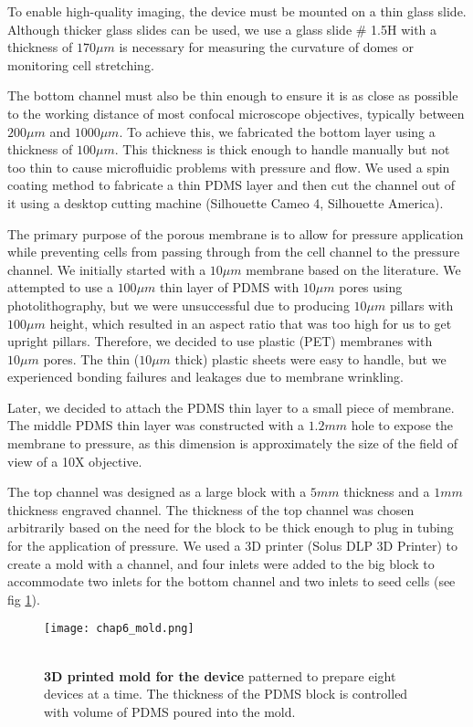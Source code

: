 To enable high-quality imaging, the device must be mounted on a thin glass slide. Although thicker glass slides can be used, we use a glass slide \# 1.5H with a thickness of $170 \mu m$ is necessary for measuring the curvature of domes or monitoring cell stretching.  

The bottom channel must also be thin enough to ensure it is as close as possible to the working distance of most confocal microscope objectives, typically between $200\mu m$ and $1000 \mu m$. To achieve this, we fabricated the bottom layer using a thickness of $100 \mu m$. This thickness is thick enough to handle manually but not too thin to cause microfluidic problems with pressure and flow. We used a spin coating method to fabricate a thin PDMS layer and then cut the channel out of it using a desktop cutting machine (Silhouette Cameo 4, Silhouette America).  

The primary purpose of the porous membrane is to allow for pressure application while preventing cells from passing through from the cell channel to the pressure channel. We initially started with a $10\mu m$ membrane based on the literature. We attempted to use a $100 \mu m$ thin layer of PDMS with $10\mu m$ pores using photolithography, but we were unsuccessful due to producing $10\mu m$ pillars with $100 \mu m$ height, which resulted in an aspect ratio that was too high for us to get upright pillars. Therefore, we decided to use plastic (PET) membranes with $10\mu m$ pores. The thin ($10\mu m$ thick) plastic sheets were easy to handle, but we experienced bonding failures and leakages due to membrane wrinkling.  

Later, we decided to attach the PDMS thin layer to a small piece of membrane. The middle PDMS thin layer was constructed with a $1.2 mm$ hole to expose the membrane to pressure, as this dimension is approximately the size of the field of view of a 10X objective.  

The top channel was designed as a large block with a $5mm$ thickness and a $1mm$ thickness engraved channel. The thickness of the top channel was chosen arbitrarily based on the need for the block to be thick enough to plug in tubing for the application of pressure. We used a 3D printer (Solus DLP 3D Printer) to create a mold with a channel, and four inlets were added to the big block to accommodate two inlets for the bottom channel and two inlets to seed cells (see fig \ref{fig_6_1a}).

\begin{figure}
	\begin{minipage}[c]{0.6\textwidth}
		\texttt{[image: chap6\_mold.png]}
	\end{minipage}\hfill
	\begin{minipage}[c]{0.35\textwidth}
		\caption{\\ \textbf{3D printed mold for the device} patterned to prepare eight devices at a time. The thickness of the PDMS block is controlled with volume of PDMS poured into the mold.
		}\label{fig_6_1a}
	\end{minipage}
\end{figure}  

